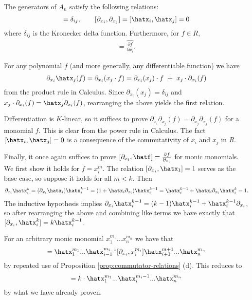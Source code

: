 \begin{lem}\label{lem:Weyl-algebra-relations}
	The generators of $A_n$ satisfy the following relations:
	\begin{align*}
		[\partial_{x_i},\hatx_j] = \delta_{ij}, \hspace{2em} [\partial_{x_i}, \partial_{x_j}] = [\hatx_i,\hatx_j] = 0
	\end{align*}
	where $\delta_{ij}$ is the Kronecker delta function. Furthermore, for $f \in R$,
	\begin{align*}
		[\partial_{x_i}, \hatf] = \widehat{\frac{\partial f}{\partial x_i}}.
	\end{align*}
\end{lem}
\begin{prf}
	For any polynomial $f$ (and more generally, any differentiable function) we have
	\begin{align*}
		\partial_{x_i}\hatx_j(f) = \partial_{x_i}(x_j\cdot f) = \partial_{x_i}(x_j) \cdot f ~+~ x_j \cdot \partial_{x_i}(f)
	\end{align*}
	from the product rule in Calculus. Since $\partial_{x_i}(x_j) = \delta_{ij}$ and $x_j\cdot \partial_{x_i}(f) = \hatx_j\partial_{x_i}(f)$, rearranging the above yields the first relation.

	Differentiation is $K$-linear, so it suffices to prove $\partial_{x_i}\partial_{x_j}(f) = \partial_{x_j}\partial_{x_j}(f)$ for a monomial $f$. This is clear from the power rule in Calculus. The fact $[\hatx_i,\hatx_j] = 0$ is a consequence of the commutativity of $x_i$ and $x_j$ in $R$.

	Finally, it once again suffices to prove $[\partial_{x_i},\hatf] = \frac{\partial f}{\partial_{x_i}}$ for monic monomials. We first show it holds for $f = x_i^m$. The relation $[\partial_{x_i}, \hatx_1] = 1$ serves as the base case, so suppose it holds for all $m < k$. Then
	\begin{align*}
		\partial_{x_i}\hatx_i^k = (\partial_{x_i}\hatx_i)\hatx_i^{k-1} = (1+\hatx_i\partial_{x_i})\hatx_i^{k-1} = \hatx_i^{k-1} + \hatx_i\partial_{x_i}\hatx_i^k-1.
	\end{align*}
	The inductive hypothesis implies $\partial_{x_i}\hatx_i^{k-1} = (k-1)\hatx_i^{k-1} + \hatx_i^{k-1}\partial_{x_i}$, so after rearranging the above and combining like terms we have exactly that $[\partial_{x_i}, \hatx_i^k] = k\hatx_i^{k-1}$.

	For an arbitrary monic monomial $x_1^{m_1}...x_n^{m_n}$ we have that
	\begin{align*}
		[\partial_{x_i}, \hatx_1^{m_1}...\hatx_n^{m_n}] = \hatx_1^{m_1}...\hatx_{i-1}^{m_{i-1}}[\partial_{x_i}, x_i^{m_i}]\hatx_{i+1}^{m+1}...\hatx_{n}^{m_n}
	\end{align*}
	by repeated use of Proposition \ref{prop:commutator-relations} (d). This reduces to
	\begin{align*}
		[\partial_{x_i}, \hatx_1^{m_1}...\hatx_n^{m_n}] = k\cdot \hatx_{1}^{m_1}...\hatx_i^{m_i - 1}...\hatx_n^{m_n}
	\end{align*}
	by what we have already proven. 
\end{prf}

